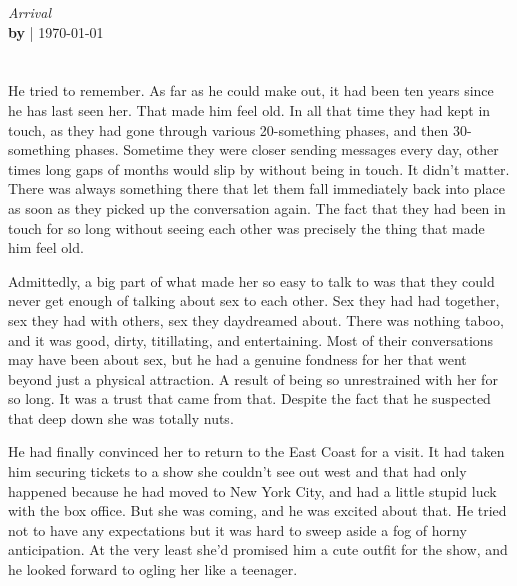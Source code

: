 \documentclass[letterpaper]{article}
\begin{document}
   \noindent
   \Large{\emph{Arrival}} \\%
   \normalsize %
   \textbf{by } | \today \\ %
   \vspace{1mm} %
   \hrulefill \\ %
\\
He tried to remember. As far as he could make out, it had been ten years since he has last seen her.
That made him feel old. In all that time they had kept in touch, as they had gone through various 20-something phases, and then 30-something phases.
Sometime they were closer sending messages every day, other times long gaps of months would slip by without being in touch.
It didn't matter. There was always something there that let them fall immediately back into place as soon as they picked up the conversation again.
The fact that they had been in touch for so long without seeing each other was precisely the thing that made him feel old.

Admittedly, a big part of what made her so easy to talk to was that they could never get enough of talking about sex to each other.
Sex they had had together, sex they had with others, sex they daydreamed about. There was nothing taboo, and it was good, dirty, titillating, and entertaining.
Most of their conversations may have been about sex, but he had a genuine fondness for her that went beyond just a physical attraction. A result of being so unrestrained with her for so long.
It was a trust that came from that. Despite the fact that he suspected that deep down she was totally nuts.

He had finally convinced her to return to the East Coast for a visit. It had taken him securing tickets to a show she couldn't see out west and that had only happened because he had moved to New York City, and had a little stupid luck with the box office.
But she was coming, and he was excited about that. He tried not to have any expectations but it was hard to sweep aside a fog of horny anticipation. At the very least she'd promised him a cute outfit for the show, and he looked forward to ogling her like a teenager.
\end{document}
